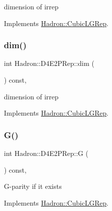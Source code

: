dimension of irrep 

Implements \mbox{\hyperlink{structHadron_1_1CubicLGRep_a3acbaea26503ed64f20df693a48e4cdd}{Hadron\+::\+Cubic\+L\+G\+Rep}}.

\mbox{\label{structHadron_1_1D4E2PRep_a840b6fdd348949a1a1c0fa8c2f9f9ecd}} 
\subsubsection{\texorpdfstring{dim()}{dim()}\hspace{0.1cm}{\footnotesize\ttfamily [3/3]}}
{\footnotesize\ttfamily int Hadron\+::\+D4\+E2\+P\+Rep\+::dim (\begin{DoxyParamCaption}{ }\end{DoxyParamCaption}) const\hspace{0.3cm}{\ttfamily [inline]}, {\ttfamily [virtual]}}

dimension of irrep 

Implements \mbox{\hyperlink{structHadron_1_1CubicLGRep_a3acbaea26503ed64f20df693a48e4cdd}{Hadron\+::\+Cubic\+L\+G\+Rep}}.

\mbox{\label{structHadron_1_1D4E2PRep_a4c158750cdc343ec7ed414e42b4f757a}} 
\subsubsection{\texorpdfstring{G()}{G()}\hspace{0.1cm}{\footnotesize\ttfamily [1/3]}}
{\footnotesize\ttfamily int Hadron\+::\+D4\+E2\+P\+Rep\+::G (\begin{DoxyParamCaption}{ }\end{DoxyParamCaption}) const\hspace{0.3cm}{\ttfamily [inline]}, {\ttfamily [virtual]}}

G-\/parity if it exists 

Implements \mbox{\hyperlink{structHadron_1_1CubicLGRep_ace26f7b2d55e3a668a14cb9026da5231}{Hadron\+::\+Cubic\+L\+G\+Rep}}.

\mbox{\label{structHadron_1_1D4E2PRep_a4c158750cdc343ec7ed414e42b4f757a}} 
